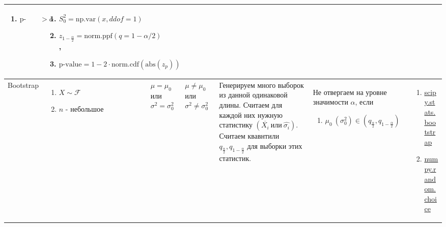 \documentclass[14pt, a1paper, fleqn]{extarticle}
\begin{document}
\begin{center}
\begin{tabular}{|p{6cm}|p{8cm}|p{3cm}|p{3cm}|p{9cm}|p{10cm}|p{14cm}|}
\begin{enumerate}
                \item \( \text{p-value} > \alpha \)
            \end{enumerate} 
            & \begin{enumerate}
                \item \( S_0^2 = \text{np.var}(x, ddof=1) \)
                \item \( z_{1-\frac{\alpha}{2}} = \text{norm.ppf}(q=1 - \alpha/2) \),
                \item \( \text{p-value} = 1 - 2 \cdot \text{norm.cdf}(\text{abs}(z_p)) \)
            \end{enumerate} \\
            \hline
            Bootstrap
            & \begin{enumerate}
             \item \( X \sim \mathcal{F} \)
             \item \( n \) - небольшое
            \end{enumerate} 
            & \(  \mu = \mu_0 \) \newline 
            или \newline
             \( \sigma^2 = \sigma^2_0 \)
            & \(  \mu \neq \mu_0 \) \newline или \newline \( \sigma^2 \neq \sigma^2_0 \)
            & Генерируем много выборок из данной одинаковой длины. Считаем для каждой них нужную статистику \( \left( \overline{X_i} ~ \text{или} ~ \hat{\sigma_i} \right) \). Считаем квавнтили \( q_{\frac{\alpha}{2}}, q_{1-\frac{\alpha}{2}} \) для выборки этих статистик.
            & Не отвергаем на уровне значимости \( \alpha \), если 
            \begin{enumerate}
                \item \( 
                    \mu_0 ~ (\sigma^2_0) \in \left( q_{\frac{\alpha}{2}}, q_{1-\frac{\alpha}{2}} \right) \)
            \end{enumerate} 
            & \begin{enumerate}
                \item \href{https://docs.scipy.org/doc/scipy/reference/generated/scipy.stats.bootstrap.html}{scipy.stats.bootstrap}
                \item \href{https://numpy.org/doc/stable/reference/random/generated/numpy.random.choice.html}{numpy.random.choice}
            \end{enumerate} \\
            \hline
        \end{tabular}
    \end{center}
\end{document}
